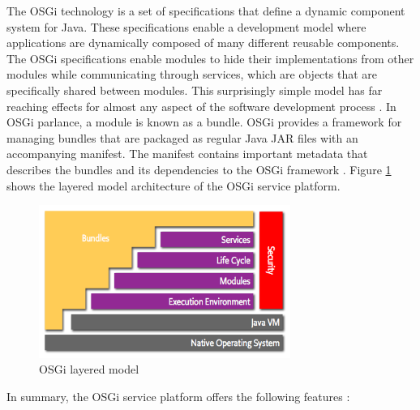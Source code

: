 The \gls{OSGi} technology is a set of specifications that define a dynamic component system for Java. These specifications enable a development model where applications are dynamically composed of many different reusable components. The \gls{OSGi} specifications enable modules to hide their implementations from other modules while communicating through services, which are objects that are specifically shared between modules. This surprisingly simple model has far reaching effects for almost any aspect of the software development process \cite{OSGi}. In OSGi parlance, a module is known as a bundle. OSGi provides a framework for managing bundles that are packaged as regular Java JAR files with an accompanying manifest. The manifest contains important metadata that describes the bundles and its dependencies to the OSGi framework \cite{Knoernschild:2012}. Figure \ref{fig:layering-osgi} shows the layered model architecture of the \gls{OSGi} service platform.

\begin{figure}[H]
\centering
\includegraphics[width=0.73\textwidth]{layering-osgi.png}
\caption{\gls{OSGi} layered model \cite{OSGi}}
\label{fig:layering-osgi}
\end{figure}

\newpage
In summary, the \gls{OSGi} service platform offers the following features \cite{Knoernschild:2012}:

